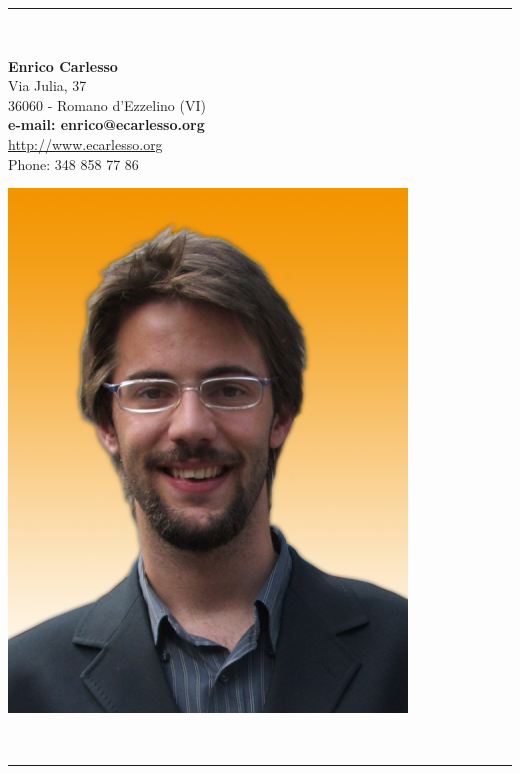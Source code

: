 \documentclass[pdftex, a4paper, 11pt]{article}
\begin{document}
\vspace*{.3cm}
\begin{center}
  \rule{.8\textwidth}{1pt}\\[10pt]
  \begin{minipage}{.55\textwidth}
    \LARGE\textbf{Enrico Carlesso}\\[13pt]
    \small Via Julia, 37\\
    36060 - Romano d'Ezzelino (VI)\\[6pt]
    \textbf{e-mail: enrico@ecarlesso.org}\\
    \small \url{http://www.ecarlesso.org}\\
    \small Phone: 348 858 77 86\\[6pt]
  \end{minipage}
  \begin{minipage}{.2\textwidth}
    \includegraphics[width=\textwidth]{foto.png}
  \end{minipage}\\[5pt]
  \rule{.8\textwidth}{1pt}
\end{center}
\vspace*{1cm}
\end{document}
